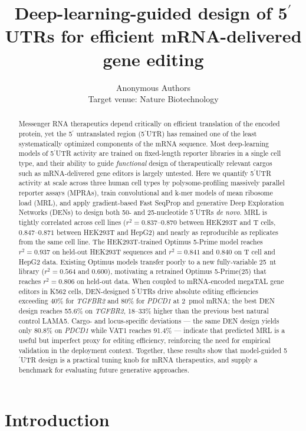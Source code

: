 \documentclass[11pt]{article}
\title{Deep-learning-guided design of 5$^\prime$UTRs for efficient
mRNA-delivered gene editing}
\author{Anonymous Authors\\Target venue: Nature Biotechnology}
\date{}
\begin{document}
\maketitle

\begin{abstract}
Messenger RNA therapeutics depend critically on efficient translation of the
encoded protein, yet the 5$^\prime$ untranslated region (5$^\prime$UTR) has
remained one of the least systematically optimized components of the mRNA
sequence. Most deep-learning models of 5$^\prime$UTR activity are trained on
fixed-length reporter libraries in a single cell type, and their ability to
guide \emph{functional} design of therapeutically relevant cargos such as
mRNA-delivered gene editors is largely untested. Here we quantify 5$^\prime$UTR
activity at scale across three human cell types by polysome-profiling massively
parallel reporter assays (MPRAs), train convolutional and k-mer models of mean
ribosome load (MRL), and apply gradient-based Fast SeqProp and generative Deep
Exploration Networks (DENs) to design both 50- and 25-nucleotide 5$^\prime$UTRs
\emph{de novo}. MRL is tightly correlated across cell lines
($r^{2} = 0.837\text{--}0.870$ between HEK293T and T cells, $0.847\text{--}0.871$
between HEK293T and HepG2) and nearly as reproducible as replicates from the
same cell line. The HEK293T-trained Optimus 5-Prime model reaches
$r^{2} = 0.937$ on held-out HEK293T sequences and $r^{2} = 0.841$ and $0.840$
on T cell and HepG2 data. Existing Optimus models transfer poorly to a new
fully-variable 25~nt library ($r^{2} = 0.564$ and $0.600$), motivating a
retrained Optimus 5-Prime(25) that reaches $r^{2} = 0.806$ on held-out data.
When coupled to mRNA-encoded megaTAL gene editors in K562 cells, DEN-designed
5$^\prime$UTRs drive absolute editing efficiencies exceeding 40\% for
\emph{TGFBR2} and 80\% for \emph{PDCD1} at 2~pmol mRNA; the best DEN design
reaches 55.6\% on \emph{TGFBR2}, 18--33\% higher than the previous best natural
control LAMA5. Cargo- and locus-specific deviations --- the same DEN design
yields only 80.8\% on \emph{PDCD1} while VAT1 reaches 91.4\% --- indicate that
predicted MRL is a useful but imperfect proxy for editing efficiency,
reinforcing the need for empirical validation in the deployment context.
Together, these results show that model-guided 5$^\prime$UTR design is a
practical tuning knob for mRNA therapeutics, and supply a benchmark for
evaluating future generative approaches.
\end{abstract}

\section{Introduction}
\end{document}
